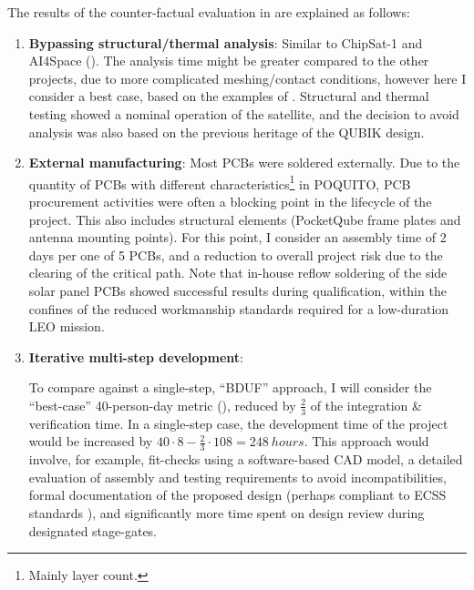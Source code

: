 \documentclass[a4paper,nobib,justified,final]{tufte-book}
\begin{document}
The results of the counter-factual evaluation in  are explained as follows:
\begin{enumerate}
	\item \textbf{Bypassing structural/thermal analysis}:
	Similar to ChipSat-1 and AI4Space (). The analysis time might be greater compared to the other projects, due to more complicated meshing/contact conditions, however here I consider a best case, based on the examples of . Structural and thermal testing showed a nominal operation of the satellite, and the decision to avoid analysis was also based on the previous heritage of the QUBIK design.
	\item \textbf{External manufacturing}:
	Most \acsp{PCB} were soldered externally. Due to the quantity of \acsp{PCB} with different characteristics\footnote{Mainly layer count.} in POQUITO, \acs{PCB} procurement activities were often a blocking point in the lifecycle of the project. This also includes structural elements (PocketQube frame plates and antenna mounting points). For this point, I consider an assembly time of 2 days per one of 5 \acsp{PCB}, and a reduction to overall project risk due to the clearing of the critical path. Note that in-house reflow soldering of the side solar panel \acsp{PCB} showed successful results during qualification, within the confines of the reduced workmanship standards required for a low-duration \acs{LEO} mission.

	\item \textbf{Iterative multi-step development}:
	
	To compare against a single-step, ``\acl{BDUF}'' approach, I will consider the ``best-case'' 40-person-day metric (), reduced by \( \frac{2}{3} \) of the integration \& verification time. In a single-step case, the development time of the project would be increased by \( 40\cdot 8 - \frac{2}{3} \cdot 108 = \qty{248}{hours} \). This approach would involve, for example, fit-checks using a software-based \acs{CAD} model, a detailed evaluation of assembly and testing requirements to avoid incompatibilities, formal documentation of the proposed design (perhaps compliant to \acs{ECSS} standards \autocite{ECSS-M-ST-10C,ECSS-E-ST-10C}), and significantly more time spent on design review during designated stage-gates. 


\end{enumerate}
\end{document}
